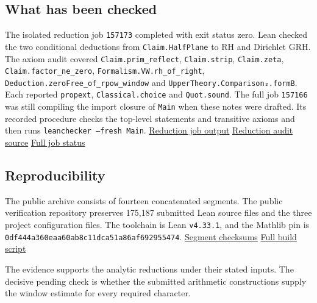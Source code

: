 \documentclass[11pt,a4paper]{article}
\newcommand{\repo}{https://github.com/LiRunGuo/riemann-lean-verification}
\newcommand{\code}[1]{\texttt{#1}}
\newcommand{\evid}[2]{\href{\repo/blob/main/#1}{#2}}
\begin{document}
\subsection*{What has been checked}

{\raggedright
The isolated reduction job \code{157173} completed with exit status
zero. Lean checked the two conditional deductions from
\code{Claim.HalfPlane} to RH and Dirichlet GRH. The axiom audit covered
\code{Claim.prim\_reflect}, \code{Claim.strip}, \code{Claim.zeta},
\code{Claim.factor\_ne\_zero}, \code{Formalism.VW.rh\_of\_right},
\code{Deduction.zeroFree\_of\_rpow\_window} and
\code{UpperTheory.Comparison₂.formB}. Each reported
\code{propext}, \code{Classical.choice} and \code{Quot.sound}.
The full job \code{157166} was still compiling the import closure of
\code{Main} when these notes were drafted. Its recorded procedure checks the
top-level statements and transitive axioms and then runs
\code{leanchecker --fresh Main}.
\evid{evidence/reduction-audit.txt}{Reduction job output}
\evid{verification/AuditReduction.lean}{Reduction audit source}
\evid{evidence/status.md}{Full job status}\par}

\subsection*{Reproducibility}

The public archive consists of fourteen concatenated segments. The public
verification repository preserves 175,187 submitted Lean source files and
the three project configuration files. The toolchain is Lean \code{v4.33.1},
and the Mathlib pin is
\nolinkurl{0df444a360eaa60ab8c11dca51a86af692955474}.
\evid{evidence/archive.sha256}{Segment checksums}
\evid{verification/build-on-slurm.sh}{Full build script}

The evidence supports the analytic reductions under their stated inputs.
The decisive pending check is whether the submitted arithmetic constructions
supply the window estimate for every required character.
\end{document}
